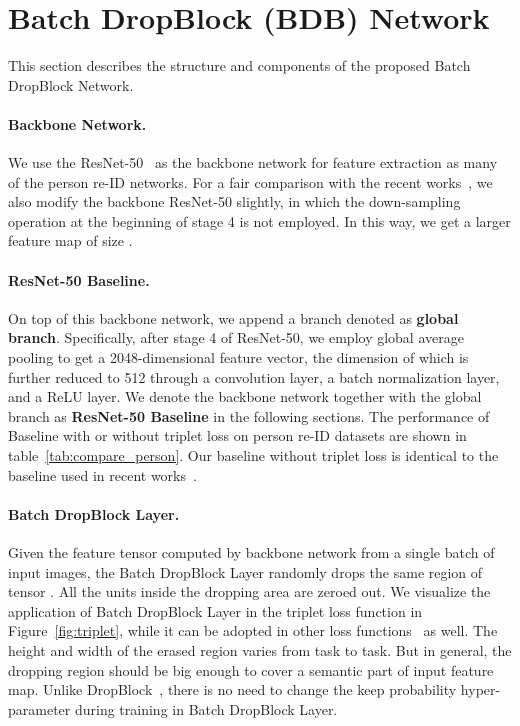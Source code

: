 \documentclass[10pt,twocolumn,letterpaper]{article}
\begin{document}
\section{Batch DropBlock (BDB) Network} \label{sec:BFE}
This section describes the structure and components of the proposed Batch DropBlock Network.

\paragraph{Backbone Network.}\vspace{-3mm}
We use the ResNet-50~\cite{he2016resnet} as the backbone network for feature extraction as many of the person re-ID networks. For a fair comparison with the recent works~\cite{sun2017beyond, wang2018mgn}, we also modify the backbone ResNet-50 slightly, in which the down-sampling operation at the beginning of stage 4 is not employed. In this way, we get a larger feature map of size .

\paragraph{ResNet-50 Baseline.}\vspace{-3mm}
On top of this backbone network, we append a branch denoted as {\bf global branch}. Specifically, after stage 4 of ResNet-50, we employ global average pooling to get a 2048-dimensional feature vector, the dimension of which is further reduced to 512 through a  convolution layer, a batch normalization layer, and a ReLU layer.
We denote the backbone network together with the global branch as {\bf ResNet-50 Baseline} in the following sections. 
The performance of Baseline with or without triplet loss on person re-ID datasets are shown in table~\ref{tab:compare_person}. Our baseline without triplet loss is identical to the baseline used in recent works~\cite{sun2017beyond, wang2018mgn}.

\paragraph{Batch DropBlock Layer.}\vspace{-3mm}
Given the feature tensor  computed by backbone network from a single batch of input images,
the Batch DropBlock Layer randomly drops the same region of tensor . All the units inside the dropping area are zeroed out. We visualize the application of Batch DropBlock Layer in the triplet loss function in Figure~\ref{fig:triplet}, while it can be adopted in other loss functions~\cite{oh2016deep,ustinova2016histogram,wu2017sampling} as well. 
The height and width of the erased region varies from task to task. But in general, the dropping region should be big enough to cover a semantic part of input feature map. Unlike DropBlock~\cite{ghiasi2018dropblock}, there is no need to change the keep probability hyper-parameter during training in Batch DropBlock Layer.
\end{document}
